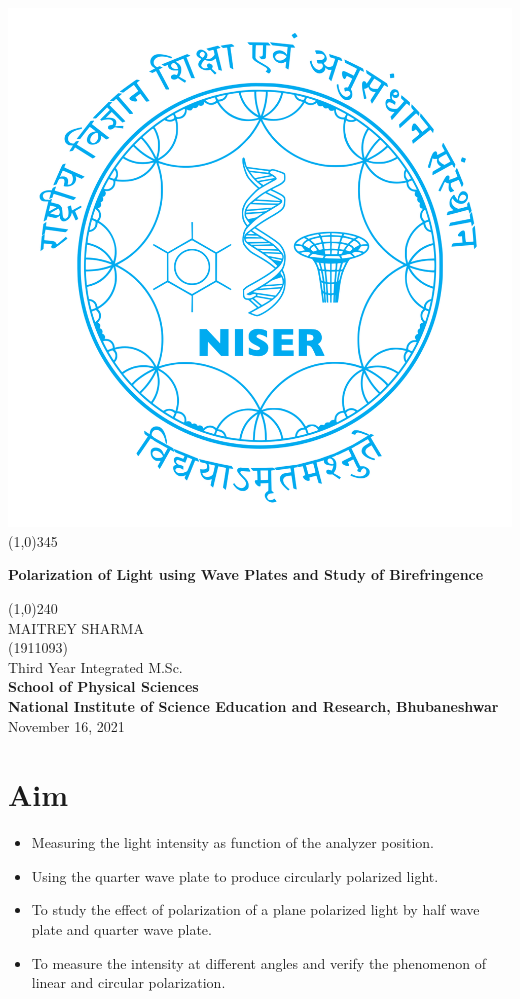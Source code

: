 \documentclass{article}
\begin{document}
\begin{titlepage}
\begin{center}
\includegraphics[scale=0.12]{document/niser.png}
\line(1,0){345}\\
[1mm]
\begin{large}
\textbf{\LARGE Polarization of Light using Wave Plates and Study of Birefringence }\\ 
\end{large}
\line(1,0){240}\\
[5cm]
\large MAITREY SHARMA\\
\small (1911093)\\
[3.5cm]
Third Year Integrated M.Sc.\\
\textbf{School of Physical Sciences}\\
\textbf{National Institute of Science Education and Research, Bhubaneshwar}\\
\small November 16, 2021
\end{center} 
\end{titlepage}
\newpage
\section{Aim}
\begin{itemize}
    \item Measuring the light intensity as function of the analyzer position.
    \item Using the quarter wave plate to produce circularly polarized light.
    \item To study the effect of polarization of a plane polarized light by half wave plate and quarter wave plate.
    \item To measure the intensity at different angles and verify the phenomenon of linear and circular polarization.
\end{itemize}
\end{document}
